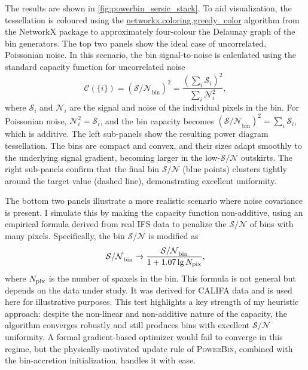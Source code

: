 \documentclass[fleqn,usenatbib]{mnras}
\newcommand{\sn}{\mathcal{S/N}}
\newcommand{\snb}{\mathcal{S/N}_\mathrm{bin}}
\begin{document}
The results are shown in \autoref{fig:powerbin_sersic_stack}. To aid visualization, the tessellation is coloured using the \href{https://networkx.org/documentation/stable/reference/algorithms/coloring.html}{networkx.coloring.greedy\_color} algorithm from the NetworkX package \citep{Hagberg2008} to approximately four-colour the Delaunay graph of the bin generators. The top two panels show the ideal case of uncorrelated, Poissonian noise. In this scenario, the bin signal-to-noise is calculated using the standard capacity function for uncorrelated noise
\begin{equation}\label{eq:capacity_uncorrelated}
    \mathcal{C}(\{i\})=(\snb)^2 = \frac{(\sum_i \mathcal{S}_i)^2}{\sum_i \mathcal{N}_i^2}, 
\end{equation}
where $\mathcal{S}_i$ and $\mathcal{N}_i$ are the signal and noise of the individual pixels in the bin. For Poissonian noise, $\mathcal{N}_i^2 = \mathcal{S}_i$, and the bin capacity becomes $(\snb)^2 = \sum_i \mathcal{S}_i$, which is additive. The left sub-panels show the resulting power diagram tessellation. The bins are compact and convex, and their sizes adapt smoothly to the underlying signal gradient, becoming larger in the low-$\sn$ outskirts. The right sub-panels confirm that the final bin $\sn$ (blue points) clusters tightly around the target value (dashed line), demonstrating excellent uniformity.

The bottom two panels illustrate a more realistic scenario where noise covariance is present. I simulate this by making the capacity function non-additive, using an empirical formula derived from real IFS data to penalize the $\sn$ of bins with many pixels. Specifically, the bin $\sn$ is modified as
\begin{equation}
    \snb \rightarrow \frac{\snb}{1 + 1.07 \lg N_{\rm pix}},
\end{equation}  
where $N_{\rm pix}$ is the number of spaxels in the bin. This formula is not general but depends on the data under study. It was derived for CALIFA data \citep[fig.~11]{GarciaBenito2015} and is used here for illustrative purposes. This test highlights a key strength of my heuristic approach: despite the non-linear and non-additive nature of the capacity, the algorithm converges robustly and still produces bins with excellent $\sn$ uniformity. A formal gradient-based optimizer would fail to converge in this regime, but the physically-motivated update rule of \textsc{PowerBin}, combined with the bin-accretion initialization, handles it with ease.
\end{document}
